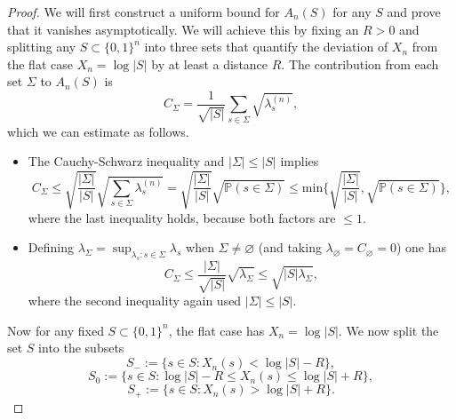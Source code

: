 \documentclass[aps,pra,reprint,superscriptaddress]{revtex4-2}
\renewcommand\l{\lambda}
\renewcommand\S{\Sigma}
\theoremstyle{definition}
\theoremstyle{remark}
\begin{document}
    
    \begin{proof}
        We will first construct a uniform bound for $A_n(S)$ for any $S$ and
        prove that it vanishes asymptotically. We will achieve this by
        fixing an $R>0$ and splitting any $S \subset \{0,1 \}^{n}$ into three sets that quantify
        the deviation of $X_n$ from the flat case $X_n = \log |S|$ by at least
        a distance $R$. The contribution from each set $\S$ to $A_n(S)$ is 
        \begin{equation}
            C_\S = \frac{1}{\sqrt{|S|}} \sum_{s \in \S} \sqrt{\l^{(n)}_s},
        \end{equation}
        which we can estimate as follows.
        \begin{itemize}
            \item[1)] The Cauchy-Schwarz inequality and $|\S| \leq |S|$ implies 
        \begin{equation}\label{eq:crit_1}
            C_\S \leq \sqrt{\frac{|\S|}{|S|}}  \sqrt{\sum_{s \in \S}
            \l^{(n)}_s} =
            \sqrt{\frac{|\S|}{|S|}} \sqrt{\mathbb{P}(s \in \S)} \leq
            \mathrm{min}\{\sqrt{\frac{|\S|}{|S|}},\sqrt{\mathbb{P}(s \in \S)}
            \},
        \end{equation}
        where the last inequality holds, because both factors are $\leq 1$.
            \item[2)] Defining $\l_\S = \sup_{\l_s: s \in \S} \l_s$ when $\S\neq\varnothing$ (and taking $\lambda_\varnothing=C_\varnothing=0$) one has
                \begin{equation}\label{eq:crit_2}
                    C_\S \leq \frac{|\S|}{\sqrt{|S|}} \sqrt{\l_\S} \leq
                    \sqrt{|S| \l_\S},
                \end{equation}
                where the second inequality again used $|\S| \leq |S|$.
        \end{itemize}
        Now for any fixed $S \subset \{0,1 \}^{n}$, the flat case has
        \(X_n = \log |S|\). We now split the set $S$ into the subsets
        \begin{equation}
          S_-:=\{s\in S:X_n(s)<\log|S|-R\},
        \end{equation}
        \begin{equation}
          S_0:=\{s\in S:\log|S|-R\le X_n(s)\le \log|S|+R\},
        \end{equation}
        \begin{equation}
          S_+:=\{s\in S:X_n(s)>\log|S|+R\}.
        \end{equation}


\end{proof}
\end{document}
